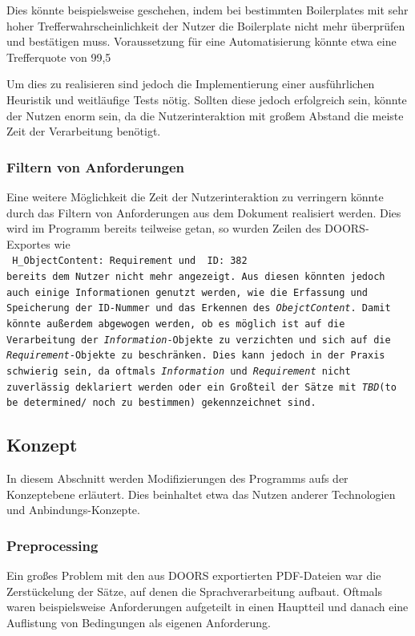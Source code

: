 \documentclass[12pt]{report}
\begin{document}
Dies könnte beispielsweise geschehen, indem bei bestimmten Boilerplates mit sehr hoher Trefferwahrscheinlichkeit der Nutzer die Boilerplate nicht mehr überprüfen und bestätigen muss. Voraussetzung für eine Automatisierung könnte etwa eine Trefferquote von 99,5%

Um dies zu realisieren sind jedoch die Implementierung einer ausführlichen Heuristik und weitläufige Tests nötig. Sollten diese jedoch erfolgreich sein, könnte der Nutzen enorm sein, da die Nutzerinteraktion mit großem Abstand die meiste Zeit der Verarbeitung benötigt.
\subsubsection{Filtern von Anforderungen}
Eine weitere Möglichkeit die Zeit der Nutzerinteraktion zu verringern könnte durch das Filtern von Anforderungen aus dem Dokument realisiert werden. Dies wird im Programm bereits teilweise getan, so wurden Zeilen des DOORS-Exportes wie\\
\tt
H\_ObjectContent: Requirement
\rm 
und 
\tt
ID: 382
\rm\\
bereits dem Nutzer nicht mehr angezeigt. Aus diesen könnten jedoch auch einige Informationen genutzt werden, wie die Erfassung und Speicherung der ID-Nummer und das Erkennen des \textit{ObejctContent}. Damit könnte außerdem abgewogen werden, ob es möglich ist auf die Verarbeitung der \textit{Information}-Objekte zu verzichten und sich auf die \textit{Requirement}-Objekte zu beschränken. Dies kann jedoch in der Praxis schwierig sein, da oftmals \textit{Information} und \textit{Requirement} nicht zuverlässig deklariert werden oder ein Großteil der Sätze mit \textit{TBD}(to be determined/ noch zu bestimmen) gekennzeichnet sind.
\subsection{Konzept}
In diesem Abschnitt werden Modifizierungen des Programms aufs der Konzeptebene erläutert. Dies beinhaltet etwa das Nutzen anderer Technologien und Anbindungs-Konzepte. 
\subsubsection{Preprocessing}
Ein großes Problem mit den aus DOORS exportierten PDF-Dateien war die Zerstückelung der Sätze, auf denen die Sprachverarbeitung aufbaut. Oftmals waren beispielsweise Anforderungen aufgeteilt in einen Hauptteil und danach eine Auflistung von Bedingungen als eigenen Anforderung.
\end{document}
